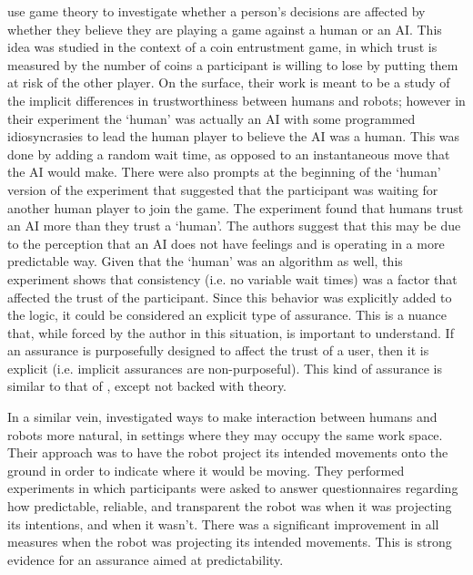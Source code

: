\citet{Wu2016-ei} use game theory to investigate whether a person's decisions are affected by whether they believe they are playing a game against a human or an AI. This idea was studied in the context of a coin entrustment game, in which trust is measured by the number of coins a participant is willing to lose by putting them at risk of the other player. On the surface, their work is meant to be a study of the implicit differences in trustworthiness between humans and robots; however in their experiment the `human' was actually an AI with some programmed idiosyncrasies to lead the human player to believe the AI was a human. This was done by adding a random wait time, as opposed to an instantaneous move that the AI would make. There were also prompts at the beginning of the `human' version of the experiment that suggested that the participant was waiting for another human player to join the game. The experiment found that humans trust an AI more than they trust a `human'. The authors suggest that this may be due to the perception that an AI does not have feelings and is operating in a more predictable way. Given that the `human' was an algorithm as well, this experiment shows that consistency (i.e. no variable wait times) was a factor that affected the trust of the participant. Since this behavior was explicitly added to the logic, it could be considered an explicit type of assurance. This is a nuance that, while forced by the author in this situation, is important to understand. If an assurance is purposefully designed to affect the trust of a user, then it is explicit (i.e. implicit assurances are non-purposeful). This kind of assurance is similar to that of \citeauthor{Dragan2013-wd}, except not backed with theory.

In a similar vein, \citet{Chadalavada2015-wx} investigated ways to make interaction between humans and robots more natural, in settings where they may occupy the same work space. Their approach was to have the robot project its intended movements onto the ground in order to indicate where it would be moving. They performed experiments in which participants were asked to answer questionnaires regarding how predictable, reliable, and transparent the robot was when it was projecting its intentions, and when it wasn't. There was a significant improvement in all measures when the robot was projecting its intended movements. This is strong evidence for an assurance aimed at predictability.

